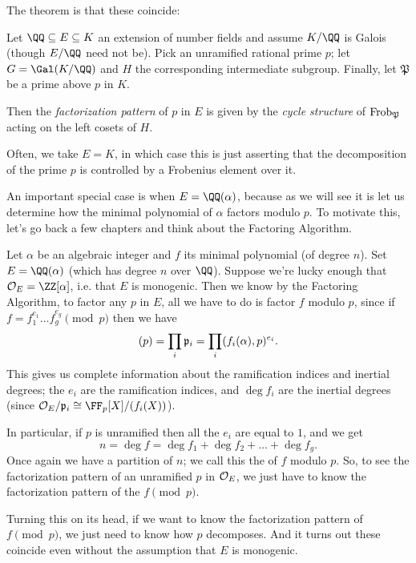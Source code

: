 The theorem is that these coincide:
\begin{theorem}
	\label{thm:frob_control_decomp}
	Let $\QQ \subseteq E \subseteq K$ an extension of number fields
	and assume $K/\QQ$ is Galois (though $E/\QQ$ need not be).
	Pick an unramified rational prime $p$; let $G = \Gal(K/\QQ)$
	and $H$ the corresponding intermediate subgroup.
	Finally, let $\mathfrak P$ be a prime above $p$ in $K$.

	Then the \emph{factorization pattern} of $p$ in $E$ is given by
	the \emph{cycle structure} of $\mathrm{Frob}_{\mathfrak P}$ acting on the left cosets of $H$.
\end{theorem}
Often, we take $E = K$, in which case this is just asserting
that the decomposition of the prime $p$ is controlled by a Frobenius element over it.

An important special case is when $E = \QQ(\alpha)$,
because as we will see it is let us determine how the minimal
polynomial of $\alpha$ factors modulo $p$.
To motivate this, let's go back a few chapters
and think about the Factoring Algorithm.

Let $\alpha$ be an algebraic integer and $f$ its minimal polynomial (of degree $n$).
Set $E = \QQ(\alpha)$ (which has degree $n$ over $\QQ$).
Suppose we're lucky enough that $\OO_E = \ZZ[\alpha]$,
i.e. that $E$ is monogenic.
Then we know by the Factoring Algorithm,
to factor any $p$ in $E$, all we have to do is factor $f$ modulo $p$,
since if $f = f_1^{e_1} \dots f_g^{e_g} \pmod p$ then we have
\[ (p) = \prod_i \mathfrak p_i = \prod_i (f_i(\alpha), p)^{e_i}. \]
This gives us complete information about the ramification indices and inertial degrees;
the $e_i$ are the ramification indices, and $\deg f_i$ are the inertial degrees
(since $\OO_E / \pp_i \cong \FF_p[X] / (f_i(X))$).

In particular, if $p$ is unramified then all the $e_i$ are equal to $1$, and we get
\[ n = \deg f = \deg f_1 + \deg f_2 + \dots + \deg f_g. \]
Once again we have a partition of $n$;
we call this the  of $f$ modulo $p$.
So, to see the factorization pattern of an unramified $p$ in $\mathcal O_E$,
we just have to know the factorization pattern of the $f \pmod p$.

Turning this on its head, if we want to know the factorization pattern of $f \pmod p$,
we just need to know how $p$ decomposes.
And it turns out these coincide even without the assumption that $E$ is monogenic.


